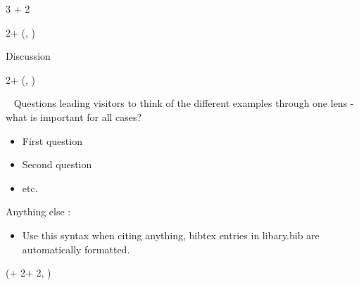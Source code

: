 \documentclass{beamer}
\newlength{\blockFour}
\begin{document}
\begin{frame}[t]
\begin{textblock*}{3 \colwidth + 2\colsep}
\end{textblock*}



\TPshowboxesfalse



\begin{textblock*}{2\colwidth + \colsep}(\leftmargin, \blockFour)

\begin{parblock}{Discussion}
\end{parblock}

\end{textblock*}




\begin{textblock*}{2\colwidth + \colsep}(\leftmargin, \blockFour)

\begin{parblock}{~}  %
	\alert{Questions leading visitors to think of the different examples through one lens - what is important for all cases?}\vspace{0.333333\baselineskip}
	\begin{itemize}
	\item[1.] First question
	\item[2.] Second question
	\item[3.] etc.  
	\end{itemize}

	\vspace{0.666667\baselineskip}\noindent%
	\alert{Anything else} :
	\begin{itemize}
		\setlength{\itemsep}{0pt}
		\item Use this syntax when citing anything, bibtex entries in libary.bib are automatically formatted.
	\end{itemize}

\end{parblock}

\end{textblock*}




\begin{textblock*}{\colwidth}(\leftmargin + 2\colwidth + 2\colsep, \blockFour)


\end{textblock*}
\end{frame}
\end{document}
